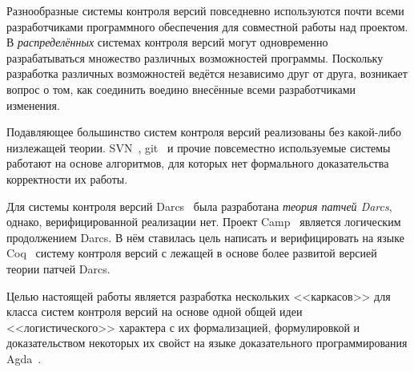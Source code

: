 \startprefacepage

Разнообразные системы контроля версий повседневно используются почти
всеми разработчиками программного обеспечения для совместной работы
над проектом. В \emph{распределённых} системах контроля версий могут
одновременно разрабатываться множество различных возможностей
программы.
Поскольку разработка различных возможностей ведётся
независимо друг от друга, возникает вопрос о том, как соединить
воедино внесённые всеми разработчиками изменения.

Подавляющее большинство систем контроля версий реализованы без
какой-либо низлежащей теории. SVN~\cite{svnbook}, git~\cite{git} и
прочие повсеместно используемые системы работают на основе алгоритмов,
для которых нет формального доказательства корректности их работы.

Для системы контроля версий Darcs~\cite{darcs} была разработана
\emph{теория патчей Darcs}, однако, верифицированной реализации нет.
Проект Camp~\cite{camp} является логическим продолжением Darcs. В нём
ставилась цель написать и верифицировать на языке Coq~\cite{coq}
систему контроля версий с лежащей в основе более развитой версией
теории патчей Darcs.

Целью настоящей работы является разработка нескольких <<каркасов>> для
класса систем контроля версий на основе одной общей идеи
<<логистического>> характера с их формализацией, формулировкой и
доказательством некоторых их свойст на языке доказательного
программирования Agda~\cite{agda}.
